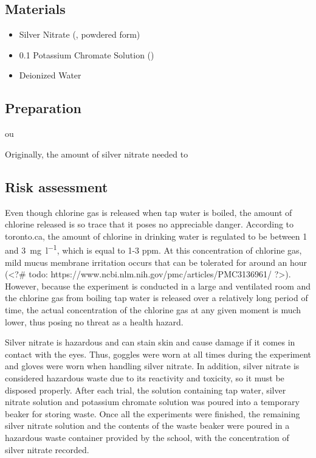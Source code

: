 \documentclass[11pt]{article}
\begin{document}
\subsection{Materials}

\begin{itemize}
	\item Silver Nitrate (, powdered form)
	\item 0.1 \mpl Potassium Chromate Solution ()
	\item Deionized Water
\end{itemize}

\subsection{Preparation}

ou


Originally, the amount of silver nitrate needed to

\subsection{Risk assessment}

Even though chlorine gas is released when tap water is boiled, the amount of chlorine released is so trace that it poses no appreciable danger. According to toronto.ca, the amount of chlorine in drinking water is regulated to be between 1 and \SI{3}{\mg\per\litre}, which is equal to 1-3 ppm. At this concentration of chlorine gas, mild mucus membrane irritation occurs that can be tolerated for around an hour (<?# todo: https://www.ncbi.nlm.nih.gov/pmc/articles/PMC3136961/ ?>). However, because the experiment is conducted in a large and ventilated room and the chlorine gas from boiling tap water is released over a relatively long period of time, the actual concentration of the chlorine gas at any given moment is much lower, thus posing no threat as a health hazard.

Silver nitrate is hazardous and can stain skin and cause damage if it comes in contact with the eyes. Thus, goggles were worn at all times during the experiment and gloves were worn when handling silver nitrate. In addition, silver nitrate is considered hazardous waste due to its reactivity and toxicity, so it must be disposed properly. After each trial, the solution containing tap water, silver nitrate solution and potassium chromate solution was poured into a temporary beaker for storing waste. Once all the experiments were finished, the remaining silver nitrate solution and the contents of the waste beaker were poured in a hazardous waste container provided by the school, with the concentration of silver nitrate recorded.
\end{document}

